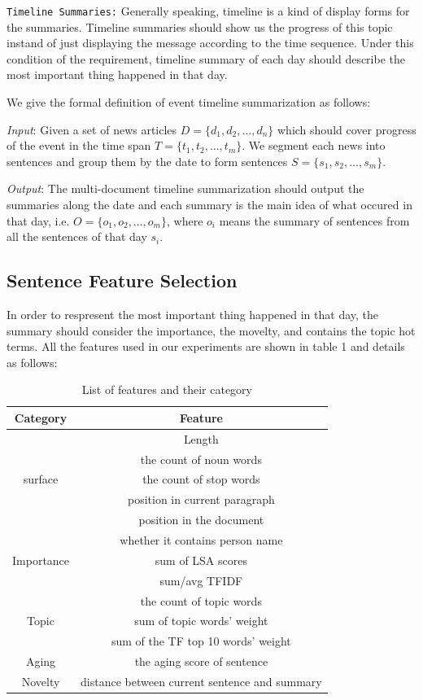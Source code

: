 \documentclass[print]{jicspack}
\begin{document}
\texttt{Timeline Summaries:} Generally speaking, timeline is a kind of display forms for the summaries. Timeline summaries should show us the progress of this topic instand of just displaying the message according to the time sequence. Under this condition of the requirement, timeline summary of each day should describe the most important thing happened in that day.

We give the formal definition of event timeline summarization as follows:

\textit{Input}: Given a set of news articles $D=\{d_1, d_2, \dots, d_n\}$ which should cover progress of the event in the time span $T=\{t_1, t_2, \dots, t_m\}$. We segment each news into sentences and group them by the date to form sentences $S=\{s_1, s_2, \dots, s_m\}$. 

\textit{Output}: The multi-document timeline summarization should output the summaries along the date and each summary is the main idea of what occured in that day, i.e. $O=\{o_1, o_2, \dots, o_m\}$, where $o_i$ means the summary of sentences from all the sentences of that day $s_i$. 


\subsection{Sentence Feature Selection}

In order to respresent the most important thing happened in that day, the summary should consider the importance, the movelty, and contains the topic hot terms. 
All the features used in our experiments are shown in table 1 and details as follows:

\begin{table}
\centering
\caption{List of features and their category}
\begin{tabular}{c|c}
\hline
Category & Feature\\
\hline
 & Length\\
 & the count of noun words\\
surface & the count of stop words\\
 & position in current paragraph\\
& position in the document\\
 & whether it contains person name\\
\hline
Importance & sum of LSA scores\\
 & sum/avg TFIDF\\
\hline
& the count of topic words\\
Topic & sum of topic words' weight\\
& sum of the TF top 10 words' weight  \\
\hline
Aging & the aging score of sentence\\
\hline 
Novelty & distance between current sentence and summary\\
\hline
 
\end{tabular}
\end{table}
\end{document}
